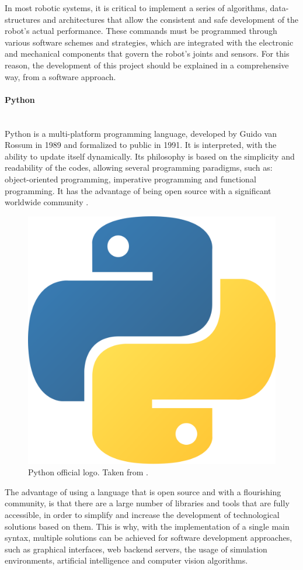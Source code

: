 \documentclass[11pt]{report} %
\newcommand{\subsubsubsection}[1]{\paragraph{#1}\mbox{}\\}
\begin{document}
In most robotic systems, it is critical to implement a series of algorithms, data-structures and architectures that allow the consistent and safe development of the robot's actual performance. These commands must be programmed through various software schemes and strategies, which are integrated with the electronic and mechanical components that govern the robot's joints and sensors. For this reason, the development of this project should be explained in a comprehensive way, from a software approach.\\

\subsubsubsection{Python}

Python is a multi-platform programming language, developed by Guido van Rossum in 1989 and formalized to public in 1991. It is interpreted, with the ability to update itself dynamically. Its philosophy is based on the simplicity and readability of the codes, allowing several programming paradigms, such as: object-oriented programming, imperative programming and functional programming. It has the advantage of being open source with a significant worldwide community \citep{cite_python_official_site}.\\

\begin{figure}[H]
    \centering
    \includegraphics[width=0.3\linewidth]{assets/imgs/reference_framework/python_logo_main.png}
    \caption{Python official logo. Taken from \citep{cite_python_official_site}.} 
    \label{fig_python_main_logo}
\end{figure}

The advantage of using a language that is open source and with a flourishing community, is that there are a large number of libraries and tools that are fully accessible, in order to simplify and increase the development of technological solutions based on them. This is why, with the implementation of a single main syntax, multiple solutions can be achieved for software development approaches, such as graphical interfaces, web backend servers, the usage of simulation environments, artificial intelligence and computer vision algorithms.\\
\end{document}
